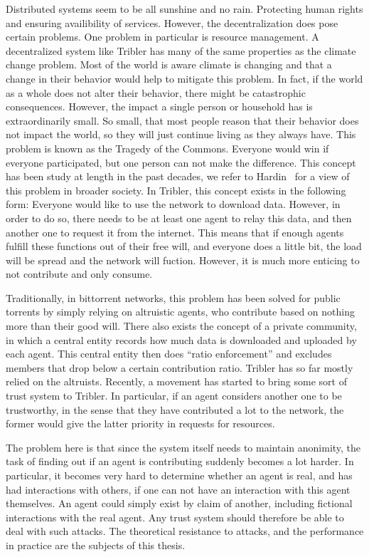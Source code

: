 \documentclass[a4paper,11pt]{book}
\theoremstyle{definition}
\begin{document}
Distributed systems seem to be all sunshine and no rain. Protecting human rights 
and ensuring availibility of services. However, the decentralization does pose certain 
problems. One problem in particular is resource management. A decentralized system
like Tribler has many of the same properties as the climate change problem. Most of the
world is aware climate is changing and that a change in their behavior would help to
mitigate this problem. In fact, if the world as a whole does not alter their behavior,
there might be catastrophic consequences. However, the impact a single person or household
has is extraordinarily small. So small, that most people reason that their behavior
does not impact the world, so they will just continue living as they always have. 
This problem is known as the Tragedy of the Commons. Everyone would win if everyone
participated, but one person can not make the difference. 
This concept has been study at length in the past decades, we refer to
Hardin~\cite{hardin2009tragedy} for a view of this problem in broader society.
In Tribler, this concept exists in the following form: Everyone would like to use 
the network to download data. However, in order to do so, there needs to be at least
one agent to relay this data, and then another one to request it from the internet.
This means that if enough agents fulfill these functions out of their free will,
and everyone does a little bit, the load will be spread and the network will
fuction. However, it is much more enticing to not contribute and only consume.

Traditionally, in bittorrent networks, this problem has been solved for public torrents
by simply relying on altruistic agents, who contribute based on nothing more than
their good will. There also exists the concept of a private community, in which a central
entity records how much data is downloaded and uploaded by each agent. This central
entity then does ``ratio enforcement'' and excludes members that drop below a certain
contribution ratio. Tribler has so far mostly relied on the altruists. 
Recently, a movement has started to bring some sort of trust system to Tribler. In particular,
if an agent considers another one to be trustworthy, in the sense that they have contributed
a lot to the network, the former would give the latter priority in requests for resources.

The problem here is that since the system itself needs to maintain anonimity, the task of
finding out if an agent is contributing suddenly becomes a lot harder. In particular, 
it becomes very hard to determine whether an agent is real, and has had interactions with
others, if one can not have an interaction with this agent themselves. An agent could simply
exist by claim of another, including fictional interactions with the real agent. Any trust system
should therefore be able to deal with such attacks. The theoretical resistance to attacks,
and the performance in practice are the subjects of this thesis.
\end{document}
